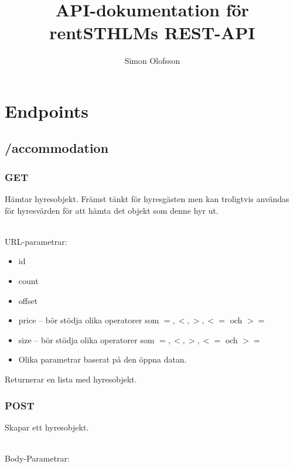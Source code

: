\documentclass{article}
\title{API-dokumentation för rentSTHLMs REST-API}
\author{Simon Olofsson}
\date{}
\begin{document}

\maketitle

\newpage

\tableofcontents

\newpage

\section {Endpoints}
\label{sec:Endpoints}

\subsection {/accommodation}
\label{sub:/accommodation}

\subsubsection {GET}
\label{ssub:GET}

Hämtar hyresobjekt. Främst tänkt för hyresgästen men kan troligtvis användas för hyresvärden för att hämta det objekt som denne hyr ut.

\\URL-parametrar:

\begin{itemize}
    \item id
    \item count
    \item offset
    \item price -- bör stödja olika operatorer som \(=, <, >, <=\) och \(>=\)
    \item size -- bör stödja olika operatorer som \(=, <, >, <=\) och \(>=\)
    \item Olika parametrar baserat på den öppna datan.
\end{itemize}

Returnerar en lista med hyresobjekt.

\subsubsection {POST}
\label{ssub:POST}

Skapar ett hyresobjekt.

\\Body-Parametrar:
\end{document}
